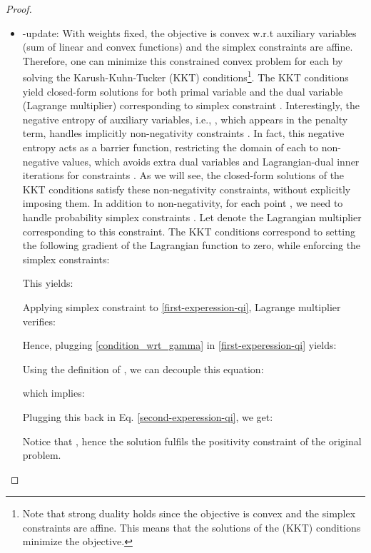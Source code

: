 \documentclass{article}
\begin{document}
\begin{proof}
\begin{itemize}
                \item -update: With weights  fixed, the objective is convex w.r.t auxiliary variables  (sum of linear and convex functions) and the simplex 
                    constraints are affine. Therefore, one can minimize this constrained convex problem for each  by solving the
                    Karush-Kuhn-Tucker (KKT) conditions\footnote{Note that strong duality holds since the objective is convex and the simplex constraints are affine. This
                    means that the solutions of the (KKT) conditions minimize the objective.}. The KKT conditions yield closed-form solutions for both
                    primal variable  and the dual variable (Lagrange multiplier) corresponding to simplex constraint .
                    Interestingly, the negative entropy of auxiliary variables, i.e., ,  which appears in the penalty term, handles implicitly non-negativity constraints . In fact, this negative entropy acts as a barrier function, restricting the domain of each  to non-negative values, which avoids extra dual variables and Lagrangian-dual inner iterations for constraints . As we will see, the closed-form solutions of the KKT conditions satisfy these non-negativity constraints, without explicitly imposing them. In addition to non-negativity, for each point , we need to handle probability simplex constraints . Let  denote the Lagrangian multiplier corresponding to this constraint. The KKT conditions correspond to setting the following gradient of the Lagrangian function to zero, while enforcing the simplex constraints:   

This yields: 
    		        
    		        Applying simplex constraint  to \eqref{first-experession-qi}, Lagrange multiplier  verifies:
    		        
    		        Hence, plugging \eqref{condition_wrt_gamma} in \eqref{first-experession-qi} yields:
    		        
    		        Using the definition of , we can decouple this equation:
    		        
    		        which implies:
    		        
    		        Plugging this back in Eq. \eqref{second-experession-qi}, we get:
    		        
    		        Notice that , hence the solution fulfils the positivity constraint of the original problem.
            \end{itemize}
        \end{proof}
\end{document}
